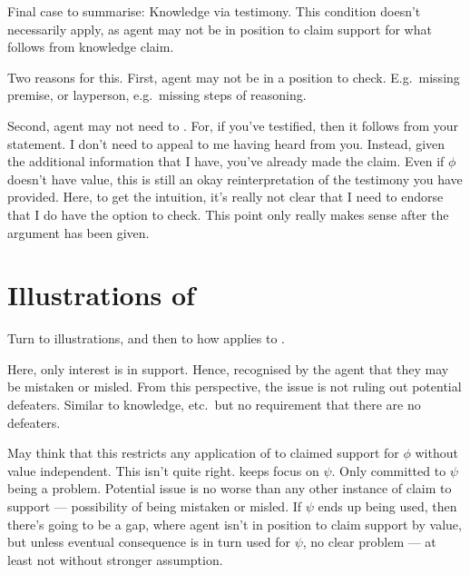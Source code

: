 \begin{note}
  Final case to summarise:
  Knowledge via testimony.
  This condition doesn't necessarily apply, as agent may not be in position to claim support for what follows from knowledge claim.

  Two reasons for this.
  First, agent may not be in a position to check.
  E.g.\ missing premise, or layperson, e.g.\ missing steps of reasoning.

  Second, agent may not need to \RBV{-}.
  For, if you've testified, then it follows from your statement.
  I don't need to appeal to me having heard from you.
  Instead, given the additional information that I have, you've already made the claim.
  Even if \(\phi\) doesn't have value, this is still an okay reinterpretation of the testimony you have provided.
  Here, to get the intuition, it's really not clear that I need to endorse that I do have the option to check.
  {
    \color{red}
    This point only really makes sense after the argument has been given.
  }
\end{note}

\section{Illustrations of \nI{}}
\label{sec:illustrations-ni}

\begin{note}
  Turn to illustrations, and then to how \nI{} applies to \gsi{}.
\end{note}

\begin{note}
  Here, only interest is in support.
  Hence, recognised by the agent that they may be mistaken or misled.
  From this perspective, the issue is not ruling out potential defeaters.
  Similar to knowledge, etc.\ but no requirement that there are no defeaters.
\end{note}

\begin{note}
  May think that this restricts any application of \RBV{} to claimed support for \(\phi\) without value independent.
  This isn't quite right.
  \eiS{} keeps focus on \(\psi\).
  Only committed to \(\psi\) being a problem.
  Potential issue is no worse than any other instance of claim to support --- possibility of being mistaken or misled.
  If \(\psi\) ends up being used, then there's going to be a gap, where agent isn't in position to claim support by value, but unless eventual consequence is in turn used for \(\psi\), no clear problem --- at least not without stronger assumption.
\end{note}

